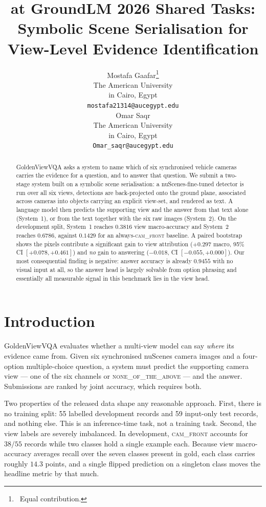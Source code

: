 \documentclass[11pt]{article}
\title{\teamname{} at GroundLM 2026 Shared Tasks: \\
       Symbolic Scene Serialisation for View-Level Evidence Identification}
\author{
  Mostafa Gaafar\thanks{\ Equal contribution.} \\
  The American University \\ in Cairo, Egypt \\
  \texttt{mostafa21314@aucegypt.edu} \\
  \And
  Omar Saqr\footnotemark[1] \\
  The American University \\ in Cairo, Egypt \\
  \texttt{Omar\_saqr@aucegypt.edu} \\
}
\begin{document}
\maketitle

\begin{abstract}
GoldenViewVQA asks a system to name which of six synchronised vehicle cameras
carries the evidence for a question, and to answer that question. We submit a
two-stage system built on a symbolic scene serialisation: a nuScenes-fine-tuned
detector is run over all six views, detections are back-projected onto the
ground plane, associated across cameras into objects carrying an explicit
view-set, and rendered as text. A language model then predicts the supporting
view and the answer from that text alone (System~1), or from the text together
with the six raw images (System~2). On the development split, System~1 reaches
$0.3816$ view macro-accuracy and System~2 reaches $0.6786$, against $0.1429$
for an always-\textsc{cam\_front} baseline. A paired bootstrap shows the
pixels contribute a significant gain to view attribution
($+0.297$ macro, 95\% CI $[+0.078,+0.461]$) and \emph{no} gain to answering
($-0.018$, CI $[-0.055,+0.000]$). Our most consequential finding is negative:
answer accuracy is already $0.9455$ with no visual input at all, so the answer
head is largely solvable from option phrasing and essentially all measurable
signal in this benchmark lies in the view head.
\end{abstract}

\section{Introduction}
\label{sec:intro}

GoldenViewVQA \citep{wang2026doesanswercomefrom} evaluates whether a
multi-view model can say \emph{where} its evidence came from. Given six
synchronised nuScenes \citep{caesar2020nuscenes} camera images and a
four-option multiple-choice question, a system must predict the supporting
camera view --- one of the six channels or \textsc{none\_of\_the\_above} ---
and the answer. Submissions are ranked by joint accuracy, which requires both.

Two properties of the released data shape any reasonable approach. First,
there is no training split: 55 labelled development records and 59 input-only
test records, and nothing else. This is an inference-time task, not a training
task. Second, the view labels are severely imbalanced. In development,
\textsc{cam\_front} accounts for $38/55$ records while two classes hold a
single example each. Because view macro-accuracy averages recall over the
seven classes present in gold, each class carries roughly $14.3$ points, and a
single flipped prediction on a singleton class moves the headline metric by
that much.
\end{document}
